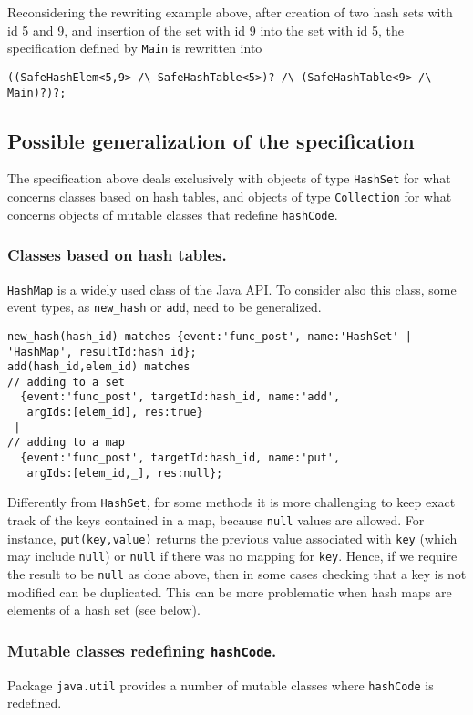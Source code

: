 Reconsidering the rewriting example above, after creation of two hash sets with id 5 and 9, and insertion
of the set with id 9 into the set with id 5, the specification defined by \lstinline{Main} is rewritten into
\begin{lstlisting}[basicstyle=\ttfamily\scriptsize]
((SafeHashElem<5,9> /\ SafeHashTable<5>)? /\ (SafeHashTable<9> /\ Main)?)?;
\end{lstlisting}

\subsection*{Possible generalization of the specification}

The specification above deals exclusively with objects of type \lstinline{HashSet} for what concerns classes based on hash tables,
and objects of type \lstinline{Collection} for what concerns objects of mutable classes that redefine \lstinline{hashCode}. 

\subsubsection*{Classes based on hash tables.}
\lstinline{HashMap} is a widely used class of the Java API. To consider also this class,
some event types, as \lstinline{new_hash} or \lstinline{add}, need to be generalized. 
\begin{lstlisting}[basicstyle=\ttfamily\scriptsize]
new_hash(hash_id) matches {event:'func_post', name:'HashSet' | 'HashMap', resultId:hash_id};
add(hash_id,elem_id) matches
// adding to a set
  {event:'func_post', targetId:hash_id, name:'add',  
   argIds:[elem_id], res:true}
 |
// adding to a map  
  {event:'func_post', targetId:hash_id, name:'put',  
   argIds:[elem_id,_], res:null};
\end{lstlisting}
Differently from \lstinline{HashSet}, for some methods it is more challenging to keep exact track of the keys contained in a map, because \lstinline{null} values are allowed. For instance, \lstinline{put(key,value)} returns the previous value associated
with \lstinline{key} (which may include \lstinline{null}) or \lstinline{null} if there was no mapping for \lstinline{key}.
Hence, if we require the result to be \lstinline{null} as done above, then in some cases checking that a key is not modified can be duplicated.
This can be more problematic when hash maps are elements of a hash set (see below).

\subsubsection*{Mutable classes redefining \lstinline{hashCode}.} 
Package \lstinline{java.util} provides a number of mutable classes where \lstinline{hashCode} is redefined.

